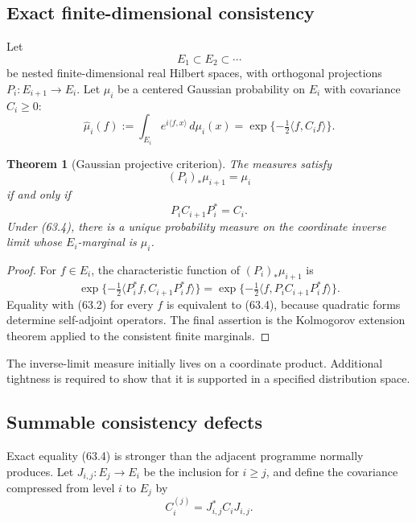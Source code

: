 \documentclass[11pt]{article}
\newtheorem{theorem}{Theorem}[section]
\begin{document}
\subsection{Exact finite-dimensional consistency}

Let
\[
                         E_1\subset E_2\subset\cdots           \tag{63.1}
\]
be nested finite-dimensional real Hilbert spaces, with orthogonal
projections \(P_i:E_{i+1}\to E_i\).  Let \(\mu_i\) be a centered
Gaussian probability on \(E_i\) with covariance \(C_i\ge0\):
\[
 \widehat\mu_i(f)
 :=\int_{E_i}e^{i\langle f,x\rangle}\,d\mu_i(x)
 =\exp\{-\tfrac12\langle f,C_if\rangle\}.                     \tag{63.2}
\]

\begin{theorem}[Gaussian projective criterion]
\label{thm:v11v63-projective}
The measures satisfy
\[
                              (P_i)_*\mu_{i+1}=\mu_i           \tag{63.3}
\]
if and only if
\[
                              P_iC_{i+1}P_i^*=C_i.             \tag{63.4}
\]
Under (63.4), there is a unique probability measure on the coordinate
inverse limit whose \(E_i\)-marginal is \(\mu_i\).
\end{theorem}

\begin{proof}
For \(f\in E_i\), the characteristic function of
\((P_i)_*\mu_{i+1}\) is
\[
 \exp\{-\tfrac12
       \langle P_i^*f,C_{i+1}P_i^*f\rangle\}
 =\exp\{-\tfrac12
       \langle f,P_iC_{i+1}P_i^*f\rangle\}.
\]
Equality with (63.2) for every \(f\) is equivalent to (63.4), because
quadratic forms determine self-adjoint operators.  The final assertion
is the Kolmogorov extension theorem applied to the consistent finite
marginals.
\end{proof}

The inverse-limit measure initially lives on a coordinate product.
Additional tightness is required to show that it is supported in a
specified distribution space.

\subsection{Summable consistency defects}

Exact equality (63.4) is stronger than the adjacent programme normally
produces.  Let \(J_{i,j}:E_j\to E_i\) be the inclusion for \(i\ge j\),
and define the covariance compressed from level \(i\) to \(E_j\) by
\[
                         C_i^{(j)}=J_{i,j}^*C_iJ_{i,j}.        \tag{63.5}
\]
\end{document}
